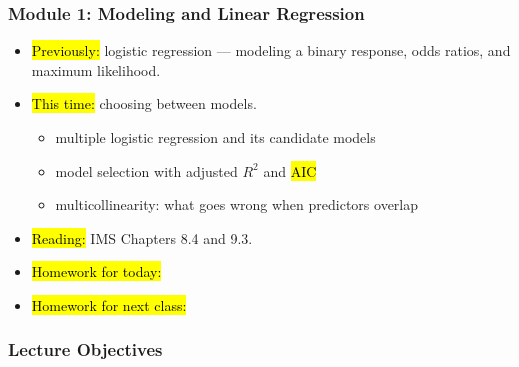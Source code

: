 

\begin{frame}
\frametitle{Module 1: Modeling and Linear Regression}
    \begin{itemize}
    \item \hl{Previously:} logistic regression --- modeling a binary response, odds ratios, and maximum likelihood.
    \item \hl{This time:} choosing between models.
      \begin{itemize}
      \item multiple logistic regression and its candidate models
      \item model selection with adjusted $R^2$ and \hl{AIC}
      \item multicollinearity: what goes wrong when predictors overlap
      \end{itemize}
    \item \hl{Reading:} IMS Chapters 8.4 and 9.3.
    \item \hl{Homework for today:}
    \item \hl{Homework for next class:}
    \end{itemize}
\end{frame}


\begin{frame}
    \frametitle{Lecture Objectives}
\end{frame}
